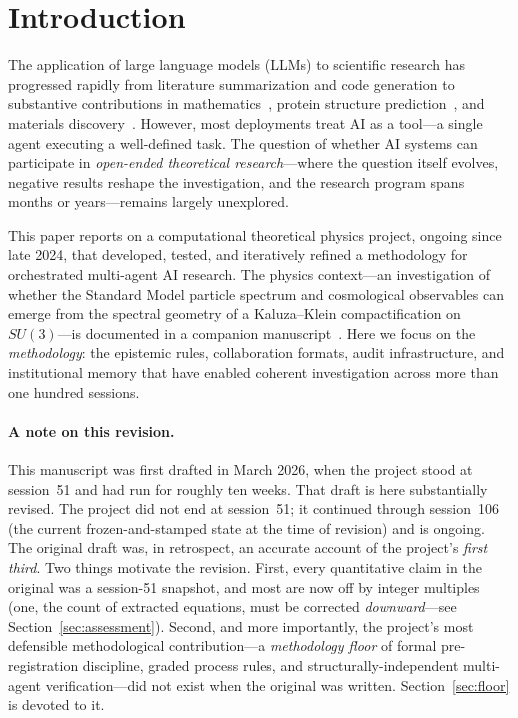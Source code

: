 \documentclass[12pt,a4paper]{article}
\begin{document}
\tableofcontents

\section{Introduction}
\label{sec:intro}

The application of large language models (LLMs) to scientific research has progressed rapidly from literature summarization and code generation to substantive contributions in mathematics~\cite{alphageometry}, protein structure prediction~\cite{alphafold}, and materials discovery~\cite{gnome}. However, most deployments treat AI as a tool---a single agent executing a well-defined task. The question of whether AI systems can participate in \emph{open-ended theoretical research}---where the question itself evolves, negative results reshape the investigation, and the research program spans months or years---remains largely unexplored.

This paper reports on a computational theoretical physics project, ongoing since late 2024, that developed, tested, and iteratively refined a methodology for orchestrated multi-agent AI research. The physics context---an investigation of whether the Standard Model particle spectrum and cosmological observables can emerge from the spectral geometry of a Kaluza--Klein compactification on $SU(3)$---is documented in a companion manuscript~\cite{framework_paper}. Here we focus on the \emph{methodology}: the epistemic rules, collaboration formats, audit infrastructure, and institutional memory that have enabled coherent investigation across more than one hundred sessions.

\paragraph{A note on this revision.} This manuscript was first drafted in March 2026, when the project stood at session~51 and had run for roughly ten weeks. That draft is here substantially revised. The project did not end at session~51; it continued through session~106 (the current frozen-and-stamped state at the time of revision) and is ongoing. The original draft was, in retrospect, an accurate account of the project's \emph{first third}. Two things motivate the revision. First, every quantitative claim in the original was a session-51 snapshot, and most are now off by integer multiples (one, the count of extracted equations, must be corrected \emph{downward}---see Section~\ref{sec:assessment}). Second, and more importantly, the project's most defensible methodological contribution---a \emph{methodology floor} of formal pre-registration discipline, graded process rules, and structurally-independent multi-agent verification---did not exist when the original was written. Section~\ref{sec:floor} is devoted to it.
\end{document}

